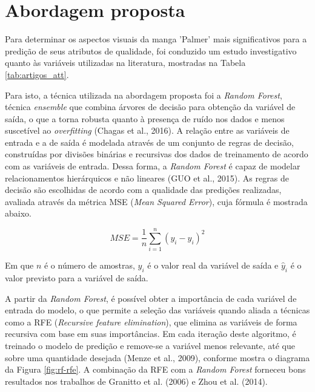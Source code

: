 \section{Abordagem proposta}

Para determinar os aspectos visuais da manga 'Palmer' mais significativos para a predição de seus atributos de qualidade, foi conduzido um estudo investigativo quanto às variáveis utilizadas na literatura, mostradas na Tabela \ref{tab:artigos_att}. 

Para isto, a técnica utilizada na abordagem proposta foi a \textit{Random Forest}, técnica \textit{ensemble} que combina árvores de decisão para obtenção da variável de saída, o que a torna robusta quanto à presença de ruído nos dados e menos suscetível ao \textit{overfitting} (Chagas et al., 2016). A relação entre as variáveis de entrada e a de saída é modelada através de um conjunto de regras de decisão, construídas por divisões binárias e recursivas dos dados de treinamento de acordo com as variáveis de entrada. Dessa forma, a \textit{Random Forest} é capaz de modelar relacionamentos hierárquicos e não lineares (GUO et al., 2015). As regras de decisão são escolhidas de acordo com a qualidade das predições realizadas, avaliada através da métrica MSE (\textit{Mean Squared Error}), cuja fórmula é mostrada abaixo.

\begin{equation*}
    MSE = \frac{1}{n}\sum_{i=1}^n (y_i - \hat{y}_i)^2
\end{equation*}

Em que $n$ é o número de amostras, $y_i$ é o valor real da variável de saída e $\hat{y}_i$ é o valor previsto para a variável de saída.

A partir da \textit{Random Forest}, é possível obter a importância de cada variável de entrada do modelo, o que permite a seleção das variáveis quando aliada a técnicas como a RFE (\textit{Recursive feature elimination}), que elimina as variáveis de forma recursiva com base em suas importâncias. Em cada iteração deste algoritmo, é treinado o modelo de predição e remove-se a variável menos relevante, até que sobre uma quantidade desejada (Menze et al., 2009), conforme mostra o diagrama da Figura \ref{fig:rf-rfe}. A combinação da RFE com a \textit{Random Forest} forneceu bons resultados nos trabalhos de Granitto et al. (2006) e  Zhou et al. (2014).

